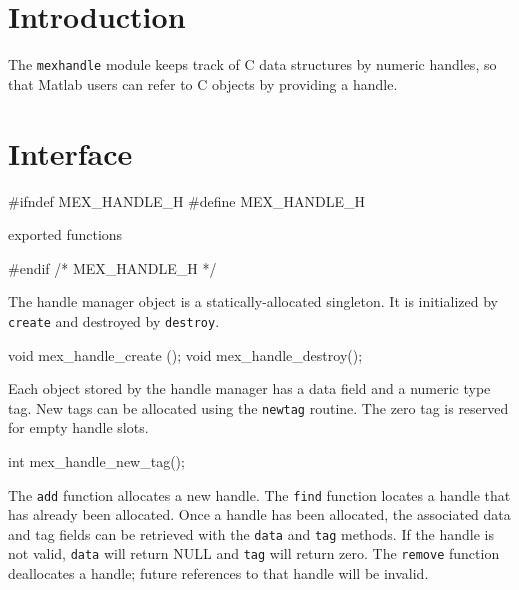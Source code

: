 
\section{Introduction}

The {\tt{}mex{}handle} module keeps track of C data structures by numeric
handles, so that Matlab users can refer to C objects by providing a
handle.


\section{Interface}

\endmoddef
#ifndef MEX_HANDLE_H
#define MEX_HANDLE_H

\LA{}exported functions~{\nwtagstyle{}}\RA{}

#endif /* MEX_HANDLE_H */
\nwendcode{}\nwdocspar

The handle manager object is a statically-allocated singleton.
It is initialized by {\tt{}create} and destroyed by {\tt{}destroy}.

\nwenddocs{}\endmoddef
void mex_handle_create ();
void mex_handle_destroy();

\nwendcode{}\nwdocspar

Each object stored by the handle manager has a data field
and a numeric type tag.  New tags can be allocated using
the {\tt{}new{}tag} routine.  The zero tag is reserved for empty
handle slots.

\nwenddocs{}\plusendmoddef
int   mex_handle_new_tag();

\nwendcode{}\nwdocspar

The {\tt{}add} function allocates a new handle.  The {\tt{}find}
function locates a handle that has already been allocated.
Once a handle has been allocated, the associated data and tag fields can
be retrieved with the {\tt{}data} and {\tt{}tag} methods.  If
the handle is not valid, {\tt{}data} will return NULL and {\tt{}tag}
will return zero.  The {\tt{}remove} function deallocates a handle;
future references to that handle will be invalid.

